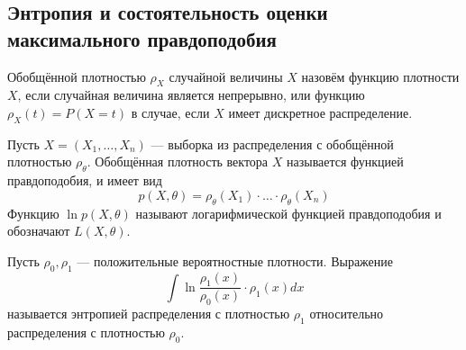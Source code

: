 \subsection{Энтропия и состоятельность оценки максимального правдоподобия}
\begin{definition}
    Обобщённой плотностью $\rho_X$ случайной величины $X$ назовём функцию плотности $X$, если случайная величина является непрерывно, или функцию
    $\rho_X(t) = P(X = t)$ в случае, если $X$ имеет дискретное распределение.
\end{definition}
\begin{definition}
    Пусть $X = (X_1, \ldots, X_n)$ --- выборка из распределения с обобщённой плотностью $\rho_{\theta}$. Обобщённая плотность вектора $X$ называется функцией
    правдоподобия, и имеет вид
    \[
        p(X, \theta) = \rho_{\theta}(X_1) \cdot \ldots \cdot \rho_{\theta}(X_n)
    \]
    Функцию $\ln p(X, \theta)$ называют логарифмической функцией правдоподобия и обозначают $L(X, \theta)$.
\end{definition}
\begin{definition}
    Пусть $\rho_0, \rho_1$ --- положительные вероятностные плотности. Выражение
    \[
        \int \ln\frac{\rho_1(x)}{\rho_0(x)} \cdot \rho_1(x)dx
    \]
    называется энтропией распределения с плотностью $\rho_1$ относительно распределения с плотностью $\rho_0$.
\end{definition}
\begin{comment}
    Здесь и далее интергралы без пределов интегрирования обозначают интегрирование по множеству, на котором задано распределение. Они вовсе не означают
    неопределённый интеграл.
\end{comment}

